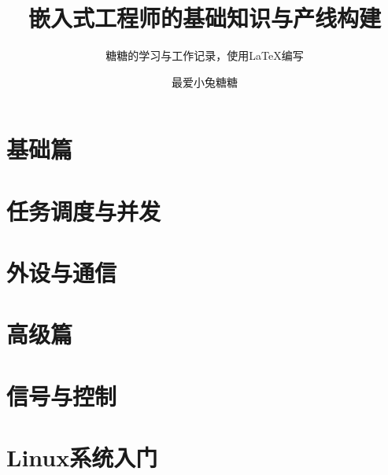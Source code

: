 \documentclass[cn,ctexfont,fancy,newtx]{colorful}
\title{嵌入式工程师的基础知识与产线构建}
\subtitle{糖糖的学习与工作记录，使用\LaTeX{}编写}
\author{最爱小兔糖糖}
\institute{真正的高手不会受到环境的影响}
\date{\zhtoday}
\begin{document}
\maketitle

\pagestyle{empty}                 %

\pagestyle{plain}                 %

\setcounter{page}{1}
\tableofcontents
\clearpage

\part{基础篇}

\part{任务调度与并发}

\part{外设与通信}

\part{高级篇}

\part{信号与控制}

\part{Linux系统入门}
\end{document}
